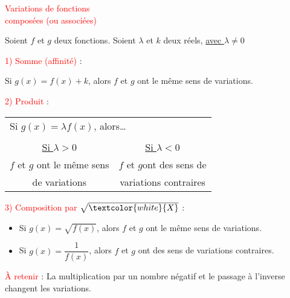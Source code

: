 \usepackage{amsmath,bm}
\usepackage[tikz]{bclogo}





\newcommand{\titre}[1]{\begin{center}{\Large\textcolor{red}{#1}}\end{center}}

\newcommand{\paragraphe}[1]{\large\textcolor{red}{#1}}

\newcommand{\NBVert}[1]{\large\textcolor{DarkGreen}{#1}}

\newcommand{\Attention}[3]{
\begin{bclogo}[%
barre = none,
couleurBord=white,%
logo=\bcattention,%
margeG = -1,%
margeD = 1,%
marge = 15%
]{\textcolor{#1}{$\quad$ #2}}
#3
\end {bclogo}
}

\titre{Variations de fonctions\\
\bigskip
 composées (ou associées)}
 
 Soient $f$ et $g$ deux fonctions. Soient $\lambda$ et $k$ deux réels, \underline{avec $\lambda \neq 0$}
 
 
\paragraphe{1) Somme (affinité)} : 

Si $g(x) = f(x) + k$, alors $f$ et $g$ ont le même sens de variations.

\paragraphe{2) Produit} : 

\begin{tabular}{c|c}
\multicolumn{2}{l}{Si $g(x) = \lambda f(x)$, alors\ldots} \\
\\
\underline{Si $\lambda > 0$} & \underline{Si $\lambda < 0$} \\
$f$ et $g$ ont le même sens & $f$ et $g$ont des sens de \\
de variations & variations contraires \\
\end{tabular}

\paragraphe{3) Composition par $\sqrt{\textcolor{white}{X}}$} :
\begin{itemize}
\item Si $g(x) = \sqrt{f(x)}$, alors $f$ et $g$ ont le même sens de variations.

\item Si $g(x) = \dfrac{1}{f(x)}$, alors $f$ et $g$ ont des  sens de variations contraires.

\end{itemize} 

\paragraphe{À retenir } : La multiplication par un nombre négatif et le passage à l'inverse changent les variations.




